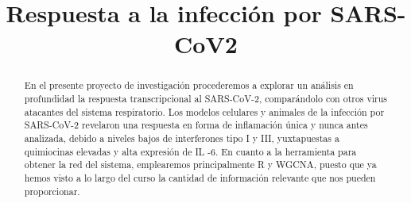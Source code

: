 \documentclass{bmcart}
\begin{document}
	\begin{frontmatter}
	
		\begin{fmbox}
			
			
			\title{Respuesta a la infección por SARS-CoV2}
			
			
			\author[
			  addressref={aff1},                   %
			  corref={aff1},                       %
			  email={carmenarrabali@uma.es}  		%
			]{ } %
			
			\author[
			  addressref={aff1},
			  email={olegbrz@uma.es}
			]{ }
			
			\author[
			addressref={aff1},
			email={jaherreraconde@uma.es}
			]{ }
			
			\author[
			addressref={aff1},
			email={smv762e@uma.es}
			]{ }
			
			
			
			\address[id=aff1]{%
			  ,             %
			  ,          %
			  ,                              %
			}
		
		\end{fmbox}%
		
		\begin{abstractbox}
		
			\begin{abstract} %
			
			En el presente proyecto de investigación procederemos a explorar un análisis en profundidad la respuesta transcripcional al SARS-CoV-2, comparándolo con otros virus atacantes del sistema respiratorio. Los modelos celulares y animales de la infección por SARS-CoV-2 revelaron una respuesta en forma de inflamación única y nunca antes analizada, debido a niveles bajos de interferones tipo I y III, yuxtapuestas a quimiocinas elevadas y alta expresión de IL -6. En cuanto a la herramienta para obtener la red del sistema, emplearemos principalmente R y WGCNA, puesto que ya hemos visto a lo largo del curso la cantidad de información relevante que nos pueden proporcionar.
			

\end{abstract}
\end{abstractbox}
\end{frontmatter}
\end{document}
